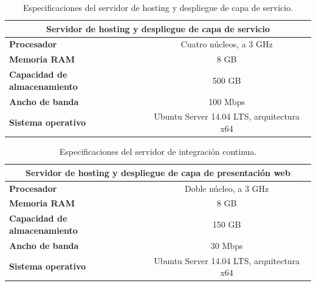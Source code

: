     \begin{table}[h]
        \centering
        \begin{tabular}{|l|c|}
            \hline
            \multicolumn{2}{|c|}{{\bf Servidor de hosting y despliegue de capa de servicio}} \\ \hline
            {\bf Procesador}                  & Cuatro núcleos, a 3 GHz                      \\ \hline
            {\bf Memoria RAM}                 & 8 GB                                         \\ \hline
            {\bf Capacidad de almacenamiento} & 500 GB                                       \\ \hline
            {\bf Ancho de banda}              & 100 Mbps                                     \\ \hline
            {\bf Sistema operativo}           & Ubuntu Server 14.04 LTS, arquitectura x64    \\ \hline
        \end{tabular}
        \caption{Especificaciones del servidor de hosting y despliegue de capa de servicio.}
        \label{especificaciones-servidor-hosting-frontend}
    \end{table}
    
    \begin{table}[h]
        \centering
        \begin{tabular}{|l|c|}
            \hline
            \multicolumn{2}{|c|}{{\bf Servidor de hosting y despliegue de capa de presentación web}} \\ \hline
            {\bf Procesador}                  & Doble núcleo, a 3 GHz                                \\ \hline
            {\bf Memoria RAM}                 & 8 GB                                                 \\ \hline
            {\bf Capacidad de almacenamiento} & 150 GB                                               \\ \hline
            {\bf Ancho de banda}              & 30 Mbps                                              \\ \hline
            {\bf Sistema operativo}           & Ubuntu Server 14.04 LTS, arquitectura x64            \\ \hline
        \end{tabular}
        \caption{Especificaciones del servidor de integración continua.}
        \label{especificaciones-servidor-hosting-backend}
    \end{table}
    
